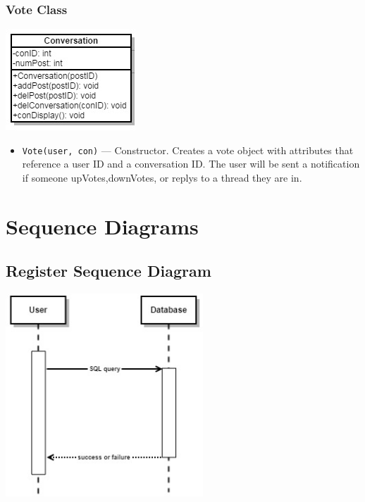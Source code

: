 \documentclass[11pt]{scrartcl}
\let\stdsection\section
\renewcommand\section{\newpage\stdsection}
\begin{document}
        \subsubsection{Vote Class}

            \centerline{\includegraphics{diagrams/conversation-UML}}

            \begin{itemize}
                \item \texttt{Vote(user, con)} --- Constructor. Creates a vote object with attributes that reference a user ID and a conversation ID. The user will be sent a notification if someone upVotes,downVotes, or replys to a thread they are in.
            \end{itemize}

\section{Sequence Diagrams}
    \subsection{Register Sequence Diagram}
        \centerline{\includegraphics[width=\textwidth,height=3in,keepaspectratio]{diagrams/register-SEQ.png}}
\end{document}
